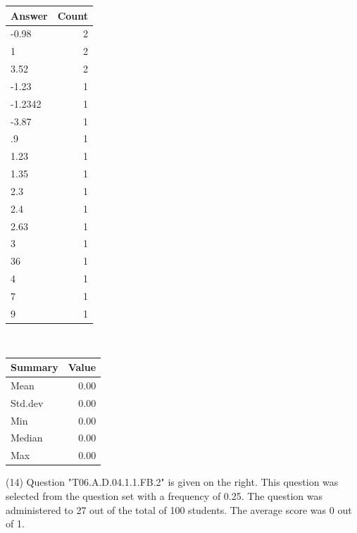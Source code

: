 \documentclass[12pt,nohyper]{tufte-handout}\usepackage[]{graphicx}\usepackage[]{color}
\begin{document}
\begin{center}%
\begin{tabular}{lr}
  \hline
Answer & Count \\ 
  \hline
-0.98 &   2 \\ 
  1 &   2 \\ 
  3.52 &   2 \\ 
  -1.23 &   1 \\ 
  -1.2342 &   1 \\ 
  -3.87 &   1 \\ 
  .9 &   1 \\ 
  1.23 &   1 \\ 
  1.35 &   1 \\ 
  2.3 &   1 \\ 
  2.4 &   1 \\ 
  2.63 &   1 \\ 
  3 &   1 \\ 
  36 &   1 \\ 
  4 &   1 \\ 
  7 &   1 \\ 
  9 &   1 \\ 
   \hline
\end{tabular}
~~~~~~~~%
\begin{tabular}{lr}
  \hline
Summary & Value \\ 
  \hline
Mean & 0.00 \\ 
  Std.dev & 0.00 \\ 
  Min & 0.00 \\ 
  Median & 0.00 \\ 
  Max & 0.00 \\ 
   \hline
\end{tabular}
\end{center}\newpage{} (14) Question "T06.A.D.04.1.1.FB.2" is given on the right. This question was selected from the question set with a frequency of 0.25. The question was administered to 27 out of the total of 100 students. The average score was 0 out of 1.
\end{document}
